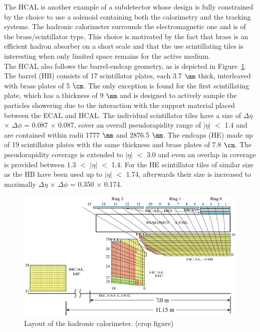 The HCAL is another example of a subdetector whose design is fully constrained by the choice to use a solenoid containing both the calorimetry and the tracking systems. The hadronic calorimeter surrounds the electromagnetic one and is of the brass/scintillator type. This choice is motivated by the fact that brass is an efficient hadron absorber on a short scale and that the use scintillating tiles is interesting when only limited space remains for the active medium.
\\
The HCAL also follows the barrel-endcap geometry, as is depicted in Figure~\ref{fig::HCAL}. The barrel (HB) consists of 17 scintillator plates, each 3.7 $\mm$ thick, interleaved with brass plates of 5 $\cm$. The only exception is found for the first scintillating plate, which has a thickness of 9 $\mm$ and is designed to actively sample the particles showering due to the interaction with the support material placed between the ECAL and HCAL. The individual scintillator tiles have a size of $\Delta \eta$ $\times$ $\Delta \phi$ = 0.087 $\times$ 0.087, cover an overall pseudorapidity range of $\vert \eta \vert$ $<$ 1.4 and are contained within radii 1777 $\mm$ and 2876.5 $\mm$. The endcaps (HE) made up of 19 scintillator plates with the same thickness and brass plates of 7.8 $\cm$. The pseudorapidity coverage is extended to $\vert \eta \vert$ $<$ 3.0 and even an overlap in coverage is provided between 1.3 $<$ $\vert \eta \vert$ $<$ 1.4. For the HE scintillator tiles of similar size as the HB have been used up to $\vert \eta \vert$ $<$ 1.74, afterwards their size is increased to maximally $\Delta \eta$ $\times$ $\Delta \phi$ = 0.350 $\times$ 0.174.
\begin{figure}[h!t]
 \centering
 \includegraphics[width = 0.99 \textwidth]{Chapters/Chapter2_CERN/Figures/CMS_HcalLayout_Slice.eps}
 \caption{Layout of the hadronic calorimeter. (crop figure)} \label{fig::HCAL}
\end{figure}

